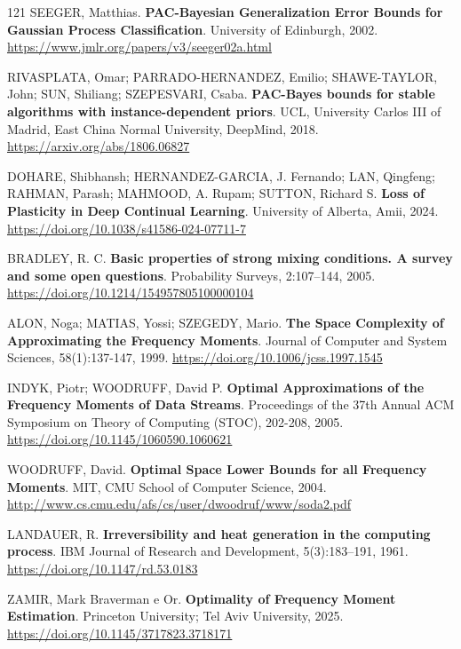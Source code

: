 \begin{thebibliography}{121}
  SEEGER, Matthias.
  \newblock \textbf{PAC-Bayesian Generalization Error Bounds for Gaussian Process Classification}.
  \newblock University of Edinburgh, 2002.
  \newblock \url{https://www.jmlr.org/papers/v3/seeger02a.html}

  RIVASPLATA, Omar; PARRADO-HERNANDEZ, Emilio; SHAWE-TAYLOR, John; SUN, Shiliang; SZEPESVARI, Csaba.
  \newblock \textbf{PAC-Bayes bounds for stable algorithms with instance-dependent priors}.
  \newblock UCL, University Carlos III of Madrid, East China Normal University, DeepMind, 2018.
  \newblock \url{https://arxiv.org/abs/1806.06827}

  DOHARE, Shibhansh; HERNANDEZ-GARCIA, J. Fernando; LAN, Qingfeng; RAHMAN, Parash; MAHMOOD, A. Rupam; SUTTON, Richard S.
  \newblock \textbf{Loss of Plasticity in Deep Continual Learning}.
  \newblock University of Alberta, Amii, 2024.
  \newblock \url{https://doi.org/10.1038/s41586-024-07711-7}

  BRADLEY, R. C.
  \newblock \textbf{Basic properties of strong mixing conditions. A survey and some open questions}.
  \newblock Probability Surveys, 2:107--144, 2005.
  \newblock \url{https://doi.org/10.1214/154957805100000104}

  ALON, Noga; MATIAS, Yossi; SZEGEDY, Mario.
  \newblock \textbf{The Space Complexity of Approximating the Frequency Moments}.
  \newblock Journal of Computer and System Sciences, 58(1):137-147, 1999.
  \newblock \url{https://doi.org/10.1006/jcss.1997.1545}

  INDYK, Piotr; WOODRUFF, David P.
  \newblock \textbf{Optimal Approximations of the Frequency Moments of Data Streams}.
  \newblock Proceedings of the 37th Annual ACM Symposium on Theory of Computing (STOC), 202-208, 2005.
  \newblock \url{https://doi.org/10.1145/1060590.1060621}

  WOODRUFF, David.
  \newblock \textbf{Optimal Space Lower Bounds for all Frequency Moments}.
  \newblock MIT, CMU School of Computer Science, 2004.
  \newblock \url{http://www.cs.cmu.edu/afs/cs/user/dwoodruf/www/soda2.pdf}

  LANDAUER, R.
  \newblock \textbf{Irreversibility and heat generation in the computing process}.
  \newblock IBM Journal of Research and Development, 5(3):183--191, 1961.
  \newblock \url{https://doi.org/10.1147/rd.53.0183}

  ZAMIR, Mark Braverman e Or.
  \newblock \textbf{Optimality of Frequency Moment Estimation}.
  \newblock Princeton University; Tel Aviv University, 2025.
  \newblock \url{https://doi.org/10.1145/3717823.3718171}

\end{thebibliography}
